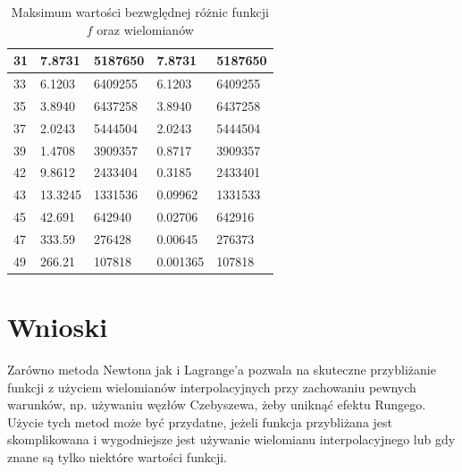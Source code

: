 \documentclass{article}
\begin{document}
\begin{table}[H]
\begin{tabular}{|l|ll|ll|}
    31& \multicolumn{1}{l|}{7.8731}  &  5187650 & \multicolumn{1}{l|}{7.8731}  & 5187650  \\ \hline
    33& \multicolumn{1}{l|}{6.1203}  & 6409255 & \multicolumn{1}{l|}{6.1203}  &  6409255 \\ \hline
    35& \multicolumn{1}{l|}{3.8940}  &  6437258 & \multicolumn{1}{l|}{3.8940}  &  6437258 \\ \hline
    37& \multicolumn{1}{l|}{2.0243}  &  5444504 & \multicolumn{1}{l|}{2.0243}  &  5444504 \\ \hline
    39& \multicolumn{1}{l|}{1.4708}  &  3909357 & \multicolumn{1}{l|}{0.8717}  & 3909357  \\ \hline
    42& \multicolumn{1}{l|}{9.8612}  & 2433404  & \multicolumn{1}{l|}{0.3185}  &  2433401 \\ \hline
    43& \multicolumn{1}{l|}{13.3245}  &  1331536 & \multicolumn{1}{l|}{0.09962}  & 1331533  \\ \hline
    45& \multicolumn{1}{l|}{42.691}  &  642940 & \multicolumn{1}{l|}{0.02706}  &  642916 \\ \hline
    47& \multicolumn{1}{l|}{333.59}  & 276428  & \multicolumn{1}{l|}{0.00645}  &  276373 \\ \hline
    49& \multicolumn{1}{l|}{266.21}  & 107818  & \multicolumn{1}{l|}{0.001365}  &  107818 \\ \hline
    \end{tabular}
    \caption{Maksimum wartości bezwględnej różnic funkcji $f$ oraz wielomianów}
\end{table}


\section{Wnioski}
Zarówno metoda Newtona jak i Lagrange'a pozwala na skuteczne przybliżanie funkcji z użyciem wielomianów interpolacyjnych przy zachowaniu 
pewnych warunków, np. używaniu węzłów Czebyszewa, żeby uniknąć efektu Rungego. Użycie tych metod może być przydatne, jeżeli funkcja przybliżana
jest skomplikowana i wygodniejsze jest używanie wielomianu interpolacyjnego lub gdy znane są tylko niektóre wartości funkcji.
\end{document}
